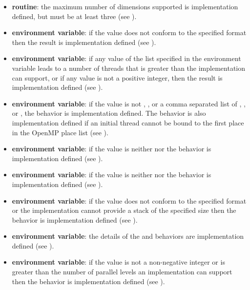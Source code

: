 \begin{itemize}
\item {} \textbf{routine}:
  the maximum number of dimensions supported is implementation defined, but
  must be at least three (see ).

\item {} \textbf{environment variable}: if the value does not
conform to the specified format then the result is implementation defined (see
).

\item {} \textbf{environment variable}: if any value of the list specified in the
 environment variable leads to a number of threads that is
greater than the implementation can support, or if any value is not a positive integer,
then the result is implementation defined (see ).

\item {} \textbf{environment variable}: if the value is not , , or a
comma separated list of , , or , the behavior is
implementation defined. The behavior is also implementation defined if an initial
thread cannot be bound to the first place in the OpenMP place list (see
).

\item {} \textbf{environment variable}: if the value is neither
 nor  the behavior is implementation defined (see
).

\item {} \textbf{environment variable}: if the value is neither
 nor  the behavior is implementation defined (see
).

\item {} \textbf{environment variable}: if the value does not conform to the
specified format or the implementation cannot provide a stack of the specified size
then the behavior is implementation defined (see ).

\item {} \textbf{environment variable}: the details of the  and
 behaviors are implementation defined (see ).

\item {} \textbf{environment variable}: if the value is not a
non-negative integer or is greater than the number of parallel levels an implementation
can support then the behavior is implementation defined (see ).


\end{itemize}
